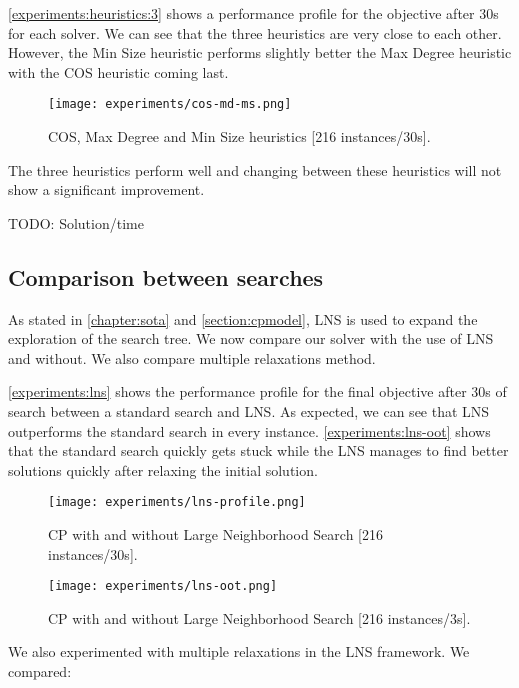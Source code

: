 \documentclass[../../thesis.tex]{subfiles}
\begin{document}
\autoref{experiments:heuristics:3} shows a performance profile for the objective after 30s for each solver.
We can see that the three heuristics are very close to each other. However, the Min Size heuristic performs slightly better the Max Degree heuristic with the 
COS heuristic coming last.


\begin{figure}
  \centering
  \texttt{[image: experiments/cos-md-ms.png]}
  \caption{COS, Max Degree and Min Size heuristics [216 instances/30s].}
  \label{experiments:heuristics:3}
\end{figure}

The three heuristics perform well and changing between these heuristics will not show a significant improvement.

TODO: Solution/time

\subsection{Comparison between searches}


As stated in \autoref{chapter:sota} and \autoref{section:cpmodel}, LNS is used to expand the exploration
of the search tree. We now compare our solver with the use of LNS and without. We also compare multiple 
relaxations method.


\autoref{experiments:lns} shows the performance profile for the final objective after 30s of search 
between a standard search and LNS. As expected, we can see that LNS outperforms the standard search 
in every instance. \autoref{experiments:lns-oot} shows that the standard search quickly gets stuck
while the LNS manages to find better solutions quickly after relaxing the initial solution.


\begin{figure}
  \centering
  \texttt{[image: experiments/lns-profile.png]}
  \caption{CP with and without Large Neighborhood Search [216 instances/30s].}
  \label{experiments:lns}
\end{figure}

\begin{figure}
  \centering
  \texttt{[image: experiments/lns-oot.png]}
  \caption{CP with and without Large Neighborhood Search [216 instances/3s].}
  \label{experiments:lns-oot}
\end{figure}



We also experimented with multiple relaxations in the LNS framework. We compared:
\end{document}
